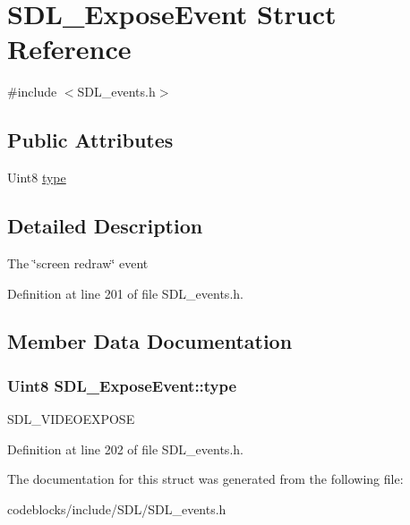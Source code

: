 \hypertarget{structSDL__ExposeEvent}{\section{S\+D\+L\+\_\+\+Expose\+Event Struct Reference}
\label{structSDL__ExposeEvent}
}


{\ttfamily \#include $<$S\+D\+L\+\_\+events.\+h$>$}

\subsection*{Public Attributes}
\begin{DoxyCompactItemize}
\item 
Uint8 \hyperlink{structSDL__ExposeEvent_a3d6e2c14e4492130733e055b6db0c8c8}{type}
\end{DoxyCompactItemize}


\subsection{Detailed Description}
The \char`\"{}screen redraw\char`\"{} event 

Definition at line 201 of file S\+D\+L\+\_\+events.\+h.



\subsection{Member Data Documentation}
\hypertarget{structSDL__ExposeEvent_a3d6e2c14e4492130733e055b6db0c8c8}{
\subsubsection[{type}]{\setlength{\rightskip}{0pt plus 5cm}Uint8 S\+D\+L\+\_\+\+Expose\+Event\+::type}}\label{structSDL__ExposeEvent_a3d6e2c14e4492130733e055b6db0c8c8}
S\+D\+L\+\_\+\+V\+I\+D\+E\+O\+E\+X\+P\+O\+S\+E 

Definition at line 202 of file S\+D\+L\+\_\+events.\+h.



The documentation for this struct was generated from the following file\+:\begin{DoxyCompactItemize}
\item 
codeblocks/include/\+S\+D\+L/S\+D\+L\+\_\+events.\+h\end{DoxyCompactItemize}

